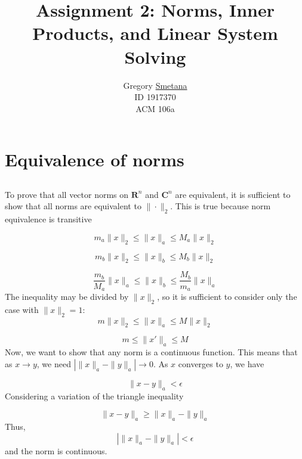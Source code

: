 \documentclass[11pt]{article} %
\title{Assignment 2: Norms, Inner Products, and Linear System
Solving}
\author{ Gregory \uline{Smetana} \\ID 1917370 \\ ACM 106a }
\begin{document}
\maketitle


\section{Equivalence of norms}

\subsection{} %

To prove that all vector norms on $\mathbf{R}^n$ and $\mathbf{C}^n$ are equivalent, it is sufficient to show that all norms are equivalent to $\| \cdot \|_2 $. This is true because norm equivalence is transitive

\begin{equation}
m_a \| x \| _2 \le \| x \|_a \le M_a \|x\|_2
\end{equation}

\begin{equation}
m_b \| x \| _2 \le \| x \|_b \le M_b \|x\|_2
\end{equation}

\begin{equation}
\frac{m_b}{M_a} \| x \| _a \le \| x \|_b \le \frac{M_b}{m_a} \|x\|_a
\end{equation}
The inequality may be divided by $\| x \|_2$, so it is sufficient to consider only the case with $\|x\|_2 = 1$:
\begin{equation}
m \| x \| _2 \le \| x \|_a \le M \|x\|_2
\end{equation}

\begin{equation}
m  \le \| x' \|_a \le M
\end{equation}
Now, we want to show that any norm is a continuous function. This means that as $x \rightarrow y$, we need $\left | \|x\|_a - \|y\|_a   \right | \rightarrow 0$. As $x$ converges to $y$, we have

\begin{equation}
\|x - y \|_a < \epsilon
\end{equation}
Considering a variation of the triangle inequality

\begin{equation}
\| x - y \|_a \ge \|x \|_a - \|y \|_a
\end{equation}
Thus,
\begin{equation}
\left | \|x\|_a - \|y\|_a   \right |  < \epsilon
\end{equation}
and the norm is continuous.
\end{document}
